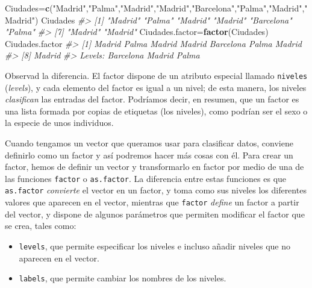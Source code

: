 \documentclass[
]{book}
\newenvironment{Shaded}{\begin{snugshade}}{\end{snugshade}}
\newcommand{\CommentTok}[1]{\textcolor[rgb]{0.56,0.35,0.01}{\textit{#1}}}
\newcommand{\KeywordTok}[1]{\textcolor[rgb]{0.13,0.29,0.53}{\textbf{#1}}}
\newcommand{\NormalTok}[1]{#1}
\newcommand{\StringTok}[1]{\textcolor[rgb]{0.31,0.60,0.02}{#1}}
\providecommand{\tightlist}{%
  \setlength{\itemsep}{0pt}\setlength{\parskip}{0pt}}
\theoremstyle{definition}
\theoremstyle{definition}
\theoremstyle{definition}
\theoremstyle{remark}
\begin{document}
\begin{Shaded}
\begin{Highlighting}[]
\NormalTok{Ciudades=}\KeywordTok{c}\NormalTok{(}\StringTok{"Madrid"}\NormalTok{,}\StringTok{"Palma"}\NormalTok{,}\StringTok{"Madrid"}\NormalTok{,}\StringTok{"Madrid"}\NormalTok{,}\StringTok{"Barcelona"}\NormalTok{,}\StringTok{"Palma"}\NormalTok{,}\StringTok{"Madrid"}\NormalTok{,}\StringTok{"Madrid"}\NormalTok{)}
\NormalTok{Ciudades}
\CommentTok{\#\textgreater{} [1] "Madrid"    "Palma"     "Madrid"    "Madrid"    "Barcelona" "Palma"    }
\CommentTok{\#\textgreater{} [7] "Madrid"    "Madrid"}
\NormalTok{Ciudades.factor=}\KeywordTok{factor}\NormalTok{(Ciudades)}
\NormalTok{Ciudades.factor}
\CommentTok{\#\textgreater{} [1] Madrid    Palma     Madrid    Madrid    Barcelona Palma     Madrid   }
\CommentTok{\#\textgreater{} [8] Madrid   }
\CommentTok{\#\textgreater{} Levels: Barcelona Madrid Palma}
\end{Highlighting}
\end{Shaded}

Observad la diferencia. El factor dispone de un atributo especial llamado \texttt{niveles} (\emph{levels}), y cada elemento del factor es igual a un nivel; de esta manera, los niveles \emph{clasifican} las entradas del factor.
Podríamos decir, en resumen, que un factor es una lista formada por copias de etiquetas (los niveles), como podrían ser el sexo o la especie de unos individuos.

Cuando tengamos un vector que queramos usar para clasificar datos, conviene definirlo como un factor y así podremos hacer más cosas con él. Para crear un factor, hemos de definir un vector y transformarlo en factor por medio de una de las funciones \texttt{factor} o \texttt{as.factor}. La diferencia entre estas funciones es que \texttt{as.factor} \emph{convierte} el vector en un factor, y toma como sus niveles los diferentes valores que aparecen en el vector, mientras que \texttt{factor} \emph{define} un factor a partir del vector, y dispone de algunos parámetros que permiten modificar el factor que se crea, tales como:

\begin{itemize}
\tightlist
\item
  \texttt{levels}, que permite especificar los niveles e incluso añadir niveles que no aparecen en el vector.
\item
  \texttt{labels}, que permite cambiar los nombres de los niveles.
\end{itemize}
\end{document}
